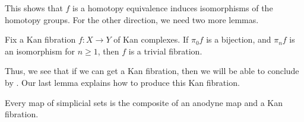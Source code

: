 \documentclass[../notes.tex]{subfiles}
\begin{document}
This shows that $f$ is a homotopy equivalence induces isomorphisms of the homotopy groups. For the other direction, we need two more lemmas.
\begin{lemma}
	Fix a Kan fibration $f\colon X\to Y$ of Kan complexes. If $\pi_0f$ is a bijection, and $\pi_nf$ is an isomorphism for $n\ge1$, then $f$ is a trivial fibration.
\end{lemma}
Thus, we see that if we can get a Kan fibration, then we will be able to conclude by . Our last lemma explains how to produce this Kan fibration.
\begin{lemma}
	Every map of simplicial sets is the composite of an anodyne map and a Kan fibration.
\end{lemma}
\end{document}
